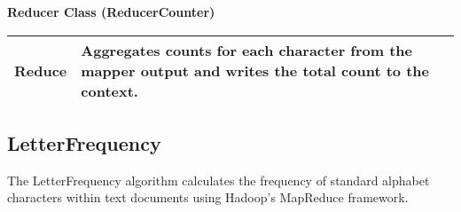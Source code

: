 \textbf{Reducer Class (ReducerCounter)}
\begin{longtable}{|>{\raggedright\arraybackslash}p{}|>{\raggedright\arraybackslash}p{}|}
    \hline
    Reduce & Aggregates counts for each character from the mapper output and writes the total count to the context. \\
    \hline
\end{longtable}



\subsection{LetterFrequency}

The LetterFrequency algorithm calculates the frequency of standard alphabet characters within text documents using Hadoop's MapReduce framework.\\





